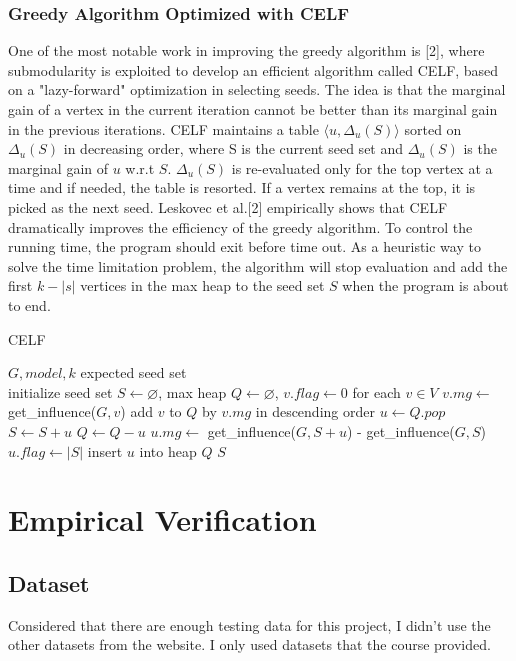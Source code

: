 \documentclass[9pt,shortpaper,twoside,web]{ieeecolor}
\begin{document}
\subsubsection{Greedy Algorithm Optimized with CELF} 
One of the most notable work in improving the greedy algorithm is [2], where submodularity is exploited to develop an efficient algorithm called CELF, based on a "lazy-forward" optimization in selecting seeds. The idea is that the marginal gain of a vertex in the current iteration cannot be better than its marginal gain in the previous iterations. CELF maintains a table $\langle u, \Delta_{u}(S) \rangle$ sorted on $\Delta_{u}(S)$ in decreasing order, where S is the current seed set and $\Delta_{u}(S)$ is the marginal gain of $u$ w.r.t $S$. $\Delta_{u}(S)$ is re-evaluated only for the top vertex at a time and if needed, the table is resorted. If a vertex remains at the top, it is picked as the next seed. Leskovec et al.[2] empirically shows that CELF dramatically improves the efficiency of the greedy algorithm. 
To control the running time, the program should exit before time out. As a heuristic way to solve the time limitation problem, the algorithm will stop evaluation and add the first $k-|s|$ vertices in the max heap to the seed set $S$ when the program is about to end.

\begin{algorithm}
\caption{CELF}
\begin{algorithmic}[h]
\renewcommand{\algorithmicrequire}{\textbf{Input:}}
\renewcommand{\algorithmicensure}{\textbf{Output:}}
\REQUIRE $G, model, k$
\ENSURE expected seed set 
\\
\STATE initialize seed set $S\gets\varnothing$, max heap $Q\gets\varnothing$, $v.flag\gets0$ for each $v\in V$
\STATE $v.mg\gets$get\_influence($G,{v}$)
\STATE add $v$ to $Q$ by $v.mg$ in descending order
\ENDFOR
{}
\STATE $u\gets Q.pop$
\STATE $S\gets S+{u}$
\STATE $Q\gets Q-{u}$
\ELSE
\STATE $u.mg\gets$ get\_influence($G,S+{u}$) - get\_influence($G,S$)
\STATE $u.flag\gets|S|$
\STATE insert $u$ into heap $Q$
\ENDIF
\ENDWHILE
\RETURN $S$
\end{algorithmic} 
\end{algorithm}
\bigskip
\section{Empirical Verification}

\subsection{Dataset}
Considered that there are enough testing data for this project, I didn't use the other datasets from the website. I only used datasets that the course provided.
\end{document}
